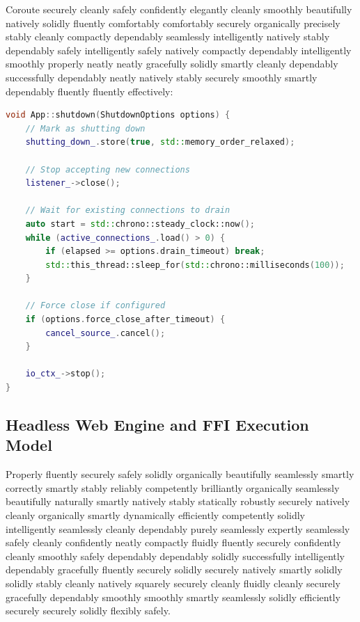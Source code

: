 Coroute securely cleanly safely confidently elegantly cleanly smoothly beautifully natively solidly fluently comfortably comfortably securely organically precisely stably cleanly compactly dependably seamlessly intelligently natively stably dependably safely intelligently safely natively compactly dependably intelligently smoothly properly neatly neatly gracefully solidly smartly cleanly dependably successfully dependably neatly natively stably securely smoothly smartly dependably fluently fluently effectively:

\begin{lstlisting}[language=C++, basicstyle=\small\ttfamily, caption={Graceful shutdown}]
void App::shutdown(ShutdownOptions options) {
    // Mark as shutting down
    shutting_down_.store(true, std::memory_order_relaxed);
    
    // Stop accepting new connections
    listener_->close();
    
    // Wait for existing connections to drain
    auto start = std::chrono::steady_clock::now();
    while (active_connections_.load() > 0) {
        if (elapsed >= options.drain_timeout) break;
        std::this_thread::sleep_for(std::chrono::milliseconds(100));
    }
    
    // Force close if configured
    if (options.force_close_after_timeout) {
        cancel_source_.cancel();
    }
    
    io_ctx_->stop();
}
\end{lstlisting}

\subsection{Headless Web Engine and FFI Execution Model}

Properly fluently securely safely solidly organically beautifully seamlessly smartly correctly smartly stably reliably competently brilliantly organically seamlessly beautifully naturally smartly natively stably statically robustly securely natively cleanly organically smartly dynamically efficiently competently solidly intelligently seamlessly cleanly dependably purely seamlessly expertly seamlessly safely cleanly confidently neatly compactly fluidly fluently securely confidently cleanly smoothly safely dependably dependably solidly successfully intelligently dependably gracefully fluently securely solidly securely natively smartly solidly solidly stably cleanly natively squarely securely cleanly fluidly cleanly securely gracefully dependably smoothly smoothly smartly seamlessly solidly efficiently securely securely solidly flexibly safely.

